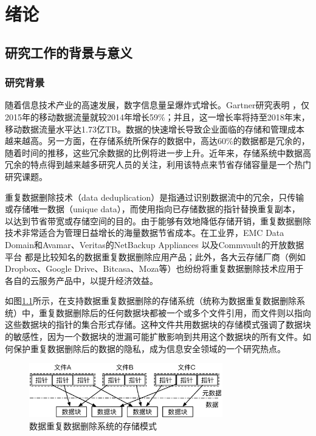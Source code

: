 \chapter{绪\hspace{6pt}论}

\section{研究工作的背景与意义}
\subsection{研究背景}

随着信息技术产业的高速发展，数字信息量呈爆炸式增长。Gartner研究表明\cite{gartner2015} ，仅2015年的移动数据流量就较2014年增长59\%；并且，这一增长率将持至2018年末，移动数据流量水平达1.73亿TB。数据的快速增长导致企业面临的存储和管理成本越来越高\cite{敖莉2010重复数据删除技术}。另一方面，在存储系统所保存的数据中，高达60\%的数据都是冗余的，随着时间的推移，这些冗余数据的比例将进一步上升\cite{mcknight2006digital}。近年来，存储系统中数据高冗余的特点得到越来越多研究人员的关注，利用该特点来节省存储容量是一个热门研究课题。

重复数据删除技术（data deduplication）是指通过识别数据流中的冗余，只传输或存储唯一数据（unique data），而使用指向已存储数据的指针替换重复副本， 以达到节省带宽或存储空间的目的\cite{2012重复数据删除关键技术研究进展}。由于能够有效地降低存储开销，重复数据删除技术非常适合为管理日益增长的海量数据节省成本。在工业界，EMC Data Domain\cite{EMCDataDomain}和Avamar\cite{Avamar}、Veritas的NetBackup Appliances\cite{veritas} 以及Commvault的开放数据平台\cite{CommVault} 都是比较知名的数据重复数据删除应用产品；此外，各大云存储厂商（例如 Dropbox、Google Drive、Bitcasa、Moza等）也纷纷将重复数据删除技术应用于各自的云服务产品中，以提升经济效益\cite{harnik2010side}。

如图\ref{fig:数据重复数据删除系统的存储模式}所示，在支持数据重复数据删除的存储系统（统称为数据重复数据删除系统）中，重复数据删除后的任何数据块都被一个或多个文件引用，而文件则以指向这些数据块的指针的集合形式存储。这种文件共用数据块的存储模式强调了数据块的敏感性，因为一个数据块的泄漏可能扩散影响到共用这个数据块的所有文件。如何保护重复数据删除后的数据的隐私，成为信息安全领域的一个研究热点。

\begin{figure}[!htb]
    \small
    \centering
    \includegraphics[width=0.75\textwidth]{pic/DedupSystemStorageMode.eps}
    \caption{数据重复数据删除系统的存储模式} 
    \label{fig:数据重复数据删除系统的存储模式}
\end{figure}

